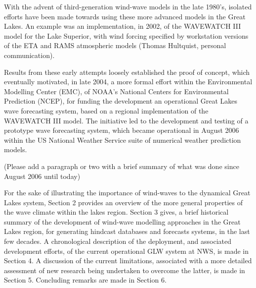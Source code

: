 With the advent of third-generation wind-wave models in the late
1980's, isolated efforts have been made towards using these more advanced
models in the Great Lakes. An example was an implementation, in 2002,
of the WAVEWATCH III model \cite{tolman02} for the Lake Superior,
with wind forcing specified by workstation versions of the ETA and
RAMS atmospheric models (Thomas Hultquist, personal communication). 

Results from these early attempts loosely
established the proof of concept, which eventually motivated, in late
2004, a more formal effort within the Environmental Modelling Center
(EMC), of NOAA's National Centers for Environmental Prediction (NCEP),
for funding the development an operational Great Lakes wave forecasting
system, based on a regional implementation of the WAVEWATCH III model. The
initiative led to the development and testing of a prototype wave forecasting
system, which became operational in August 2006 within the US National
Weather Service suite of numerical weather prediction models.

(Please add a paragraph or two with a brief summary of what was done
since August 2006 until today)

For the sake of illustrating the importance of wind-waves to the dynamical
Great Lakes system, Section 2 provides an overview of the more general
properties of the wave climate within the lakes region. Section
3 gives, a brief historical summary of the development of wind-wave
modelling approaches in the Great Lakes region, for generating hindcast
databases and forecasts systems, in the last few decades.
A chronological description of the deployment, and associated development
efforts, of the current operational GLW system at NWS, is made in
Section 4. A discussion of the current limitations, associated with
a more detailed assessment of new research being undertaken to overcome
the latter, is made in Section 5. Concluding remarks are made in Section
6.

